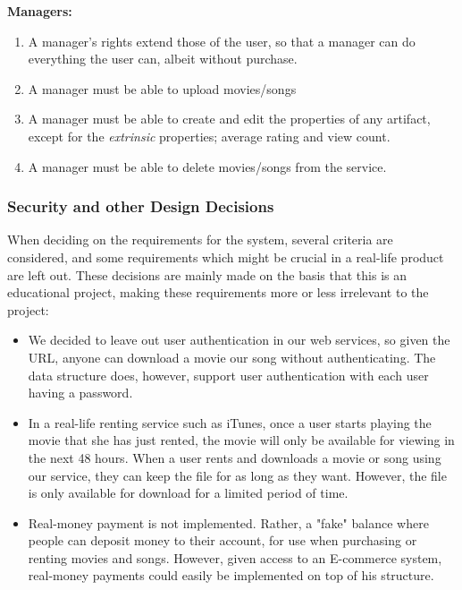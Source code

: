 \textbf{Managers:}
\begin{enumerate}
\setcounter{enumi}{\theenumTemp}
\item A manager's rights extend those of the user, so that a manager can do
	everything the user can, albeit without purchase.
\item A manager must be able to upload movies/songs
\item A manager must be able to create and edit the properties of any artifact,
	except for the \emph{extrinsic} properties; average rating and view
	count.
\item A manager must be able to delete movies/songs from the service.
\end{enumerate}

\subsubsection{Security and other Design Decisions} When deciding on the
requirements for the system, several criteria are considered, and some
requirements which might be crucial in a real-life product are left out. These
decisions are mainly made on the basis that this is an educational project,
making these requirements more or less irrelevant to the project:
\begin{itemize}
\item We decided to leave out user authentication in our web services, so given
	the URL, anyone can download a movie our song without authenticating.
	The data structure does, however, support user authentication with each
	user having a password.
\item In a real-life renting service such as iTunes, once a user starts playing
	the movie that she has just rented, the movie will only be available
	for viewing in the next 48 hours. When a user rents and downloads a
	movie or song using our service, they can keep the file for as long as
	they want. However, the file is only available for download for a
	limited period of time.
\item Real-money payment is not implemented. Rather, a "fake" balance where
	people can deposit money to their account, for use when purchasing or
	renting movies and songs. However, given access to an E-commerce
	system, real-money payments could easily be implemented on top of his
	structure.
\end{itemize}
